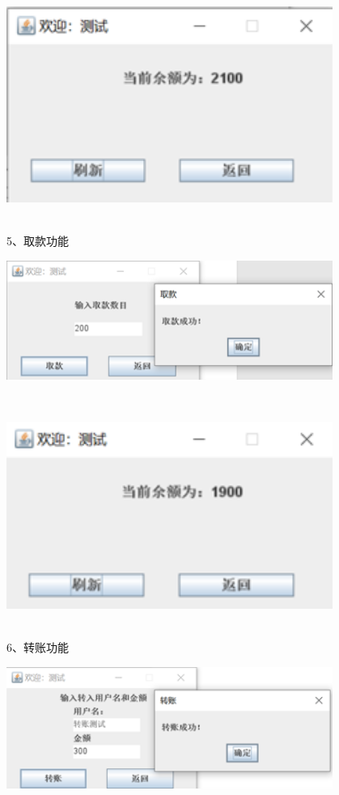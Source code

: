 \begin{centering}
	\centering
	\includegraphics[width=0.8\textwidth]{figure/图9}
	\label{fig:example}
\end{centering}\\
5、取款功能\\
\begin{centering}
	\centering
	\includegraphics[width=0.8\textwidth]{figure/图10}
	\label{fig:example}
\end{centering}\\
\begin{centering}
	\centering
	\includegraphics[width=0.8\textwidth]{figure/图11}
	\label{fig:example}
\end{centering}\\
6、转账功能\\
\begin{centering}
	\centering
	\includegraphics[width=0.8\textwidth]{figure/图12}
	\label{fig:example}
\end{centering}\\
